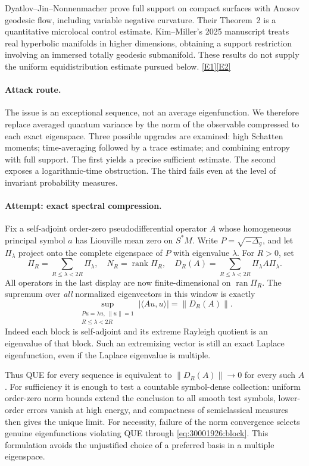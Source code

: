 \documentclass[11pt,a4paper]{article}
\newcommand{\eref}[2]{\hyperlink{extra:#1:#2}{[E#2]}}
\numberwithin{equation}{section}
\begin{document}
Dyatlov--Jin--Nonnenmacher prove full support on compact surfaces with
Anosov geodesic flow, including variable negative curvature. Their
Theorem~2 is a quantitative microlocal control estimate. Kim--Miller's
2025 manuscript treats real hyperbolic manifolds in higher dimensions,
obtaining a support restriction involving an immersed totally geodesic
submanifold. These results do not supply the uniform equidistribution
estimate pursued below. \eref{30001926}{1}\eref{30001926}{2}

\paragraph{Attack route.}
The issue is an exceptional sequence, not an average eigenfunction. We
therefore replace averaged quantum variance by the norm of the observable
compressed to each exact eigenspace. Three possible upgrades are examined:
high Schatten moments; time-averaging followed by a trace estimate; and
combining entropy with full support. The first yields a precise sufficient
estimate. The second exposes a logarithmic-time obstruction. The third
fails even at the level of invariant probability measures.

\paragraph{Attempt: exact spectral compression.}
Fix a self-adjoint order-zero pseudodifferential operator $A$ whose
homogeneous principal symbol $a$ has Liouville mean zero on $S^*M$.
Write $P=\sqrt{-\Delta_g}$, and let $\Pi_\lambda$ project onto the complete
eigenspace of $P$ with eigenvalue $\lambda$. For $R>0$, set
\[
 \Pi_R=\sum_{R\leq\lambda<2R}\Pi_\lambda,\quad
 N_R=\operatorname{rank}\Pi_R,\quad
 D_R(A)=\sum_{R\leq\lambda<2R}\Pi_\lambda A\Pi_\lambda.
\]
All operators in the last display are now finite-dimensional on
$\operatorname{ran}\Pi_R$. The supremum over \emph{all} normalized eigenvectors
in this window is exactly
\begin{equation}\label{eq:30001926:block}
 \sup_{\substack{Pu=\lambda u,\ \|u\|=1\\ R\leq\lambda<2R}}
 |\langle Au,u\rangle|=\|D_R(A)\|.
\end{equation}
Indeed each block is self-adjoint and its extreme Rayleigh quotient is an
eigenvalue of that block. Such an extremizing vector is still an exact
Laplace eigenfunction, even if the Laplace eigenvalue is multiple.

Thus QUE for every sequence is equivalent to $\|D_R(A)\|\to0$ for every
such $A$. For sufficiency it is enough to test a countable symbol-dense
collection: uniform order-zero norm bounds extend the conclusion to all
smooth test symbols, lower-order errors vanish at high energy, and
compactness of semiclassical measures then gives the unique limit.
For necessity, failure of the norm convergence selects genuine
eigenfunctions violating QUE through \eqref{eq:30001926:block}. This formulation
avoids the unjustified choice of a preferred basis in a multiple eigenspace.
\end{document}
